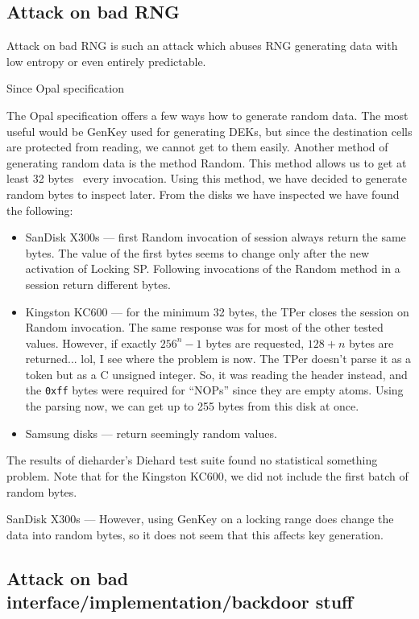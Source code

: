 \subsection{Attack on bad RNG}

Attack on bad RNG is such an attack which abuses RNG generating data with low entropy or even entirely predictable. 

Since Opal specification 

The Opal specification offers a few ways how to generate random data. The most useful would be GenKey used for generating DEKs, but since the destination cells are protected from reading, we cannot get to them easily. Another method of generating random data is the method Random. This method allows us to get at least 32 bytes~\cite{tcg-opal2} every invocation. Using this method, we have decided to generate random bytes to inspect later.
From the disks we have inspected we have found the following:
\begin{itemize}
    \item SanDisk X300s --- first Random invocation of session always return the same bytes. The value of the first bytes seems to change only after the new activation of Locking SP. Following invocations of the Random method in a session return different bytes.
    \item Kingston KC600 --- for the minimum 32 bytes, the TPer closes the session on Random invocation. The same response was for most of the other tested values. However, if exactly $256^n-1$ bytes are requested, $128+n$ bytes are returned... lol, I see where the problem is now. The TPer doesn't parse it as a token but as a C unsigned integer. So, it was reading the header instead, and the \verb|0xff| bytes were required for ``NOPs'' since they are empty atoms. Using the parsing now, we can get up to 255 bytes from this disk at once.
    \item Samsung disks --- return seemingly random values.
\end{itemize}
The results of dieharder's Diehard test suite found no statistical something problem. Note that for the Kingston KC600, we did not include the first batch of random bytes.

SanDisk X300s --- However, using GenKey on a locking range does change the data into random bytes, so it does not seem that this affects key generation.

\subsection{Attack on bad interface/implementation/backdoor stuff}

